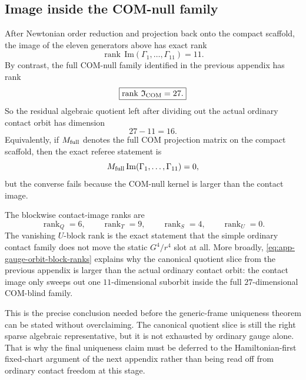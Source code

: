 \documentclass[11pt]{article}
\begin{document}
\subsection{Image inside the COM-null family}
\label{app:gauge-orbit-image}

After Newtonian order reduction and projection back onto the compact scaffold,
the image of the eleven generators above has exact rank
\begin{equation}
\boxed{\operatorname{rank}\,\mathrm{Im}(\Gamma_1,\dots,\Gamma_{11})=11.}
\label{eq:app-gauge-orbit-image-rank}
\end{equation}
By contrast, the full COM-null family identified in the previous appendix has
rank
\begin{equation}
\boxed{\operatorname{rank}\,\mathfrak I_{\rm COM}=27.}
\label{eq:app-gauge-orbit-com-null-rank}
\end{equation}
So the residual algebraic quotient left after dividing out the actual ordinary
contact orbit has dimension
\begin{equation}
\boxed{27-11=16.}
\label{eq:app-gauge-orbit-residual-quotient}
\end{equation}
Equivalently, if $M_{\rm full}$ denotes the full COM projection matrix on the
compact scaffold, then the exact referee statement is
\begin{equation}
M_{\rm full}\,\mathrm{Im}(\Gamma_1,\dots,\Gamma_{11})=0,
\label{eq:app-gauge-orbit-zero-com-image}
\end{equation}
but the converse fails because the COM-null kernel is larger than the contact
image.

The blockwise contact-image ranks are
\begin{equation}
\boxed{\operatorname{rank}_Q=6,
\qquad
\operatorname{rank}_T=9,
\qquad
\operatorname{rank}_S=4,
\qquad
\operatorname{rank}_U=0.}
\label{eq:app-gauge-orbit-block-ranks}
\end{equation}
The vanishing $U$-block rank is the exact statement that the simple ordinary
contact family does not move the static $G^4/r^4$ slot at all.  More broadly,
\eqref{eq:app-gauge-orbit-block-ranks} explains why the canonical quotient slice
from the previous appendix is larger than the actual ordinary contact orbit: the
contact image only sweeps out one $11$-dimensional suborbit inside the full
$27$-dimensional COM-blind family.

This is the precise conclusion needed before the generic-frame uniqueness theorem
can be stated without overclaiming.  The canonical quotient slice is still the
right sparse algebraic representative, but it is not exhausted by ordinary gauge
alone.  That is why the final uniqueness claim must be deferred to the
Hamiltonian-first fixed-chart argument of the next appendix rather than being
read off from ordinary contact freedom at this stage.
\end{document}
